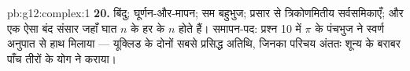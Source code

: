 \begin{solution}{pb:g12:complex:1}
\textbf{20.} बिंदु; घूर्णन-और-मापन; सम बहुभुज; प्रसार से त्रिकोणमितीय
सर्वसमिकाएँ; और एक ऐसा बंद संसार जहाँ घात $n$ के हर  के $n$ 
होते हैं। समापन-पद: प्रश्न 10 में $\pi$ के पंचभुज ने स्वर्ण अनुपात से हाथ
मिलाया --- यूक्लिड के दोनों सबसे प्रसिद्ध अतिथि, जिनका परिचय अंततः शून्य के
बराबर पाँच तीरों के योग ने कराया।
\end{solution}
